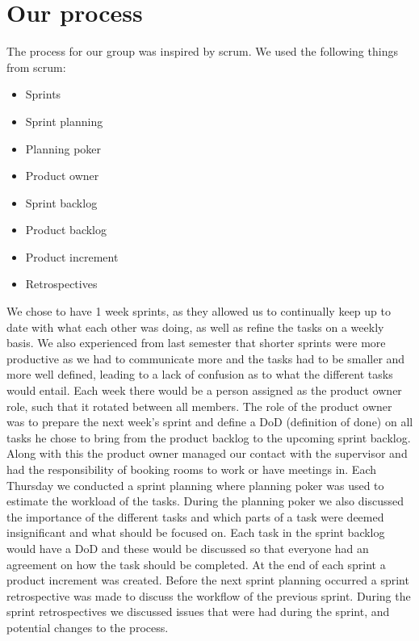 \section{Our process}\label{sec:our-process}
The process for our group was inspired by scrum. We used the following things from scrum:

\begin{itemize}
    \item Sprints 
    \item Sprint planning 
    \item Planning poker 
    \item Product owner 
    \item Sprint backlog 
    \item Product backlog   
    \item Product increment 
    \item Retrospectives 
\end{itemize}

\noindent
We chose to have 1 week sprints, as they allowed us to continually keep up to date with what each other was doing, as well as refine the tasks on a weekly basis.
We also experienced from last semester that shorter sprints were more productive as we had to communicate more and the tasks had to be smaller and more well defined, leading to a lack of confusion as to what the different tasks would entail. 
Each week there would be a person assigned as the product owner role, such that it rotated between all members.
The role of the product owner was to prepare the next week's sprint and define a DoD (definition of done) on all tasks he chose to bring from the product backlog to the upcoming sprint backlog.
Along with this the product owner managed our contact with the supervisor and had the responsibility of booking rooms to work or have meetings in.
Each Thursday we conducted a sprint planning where planning poker was used to estimate the workload of the tasks.
During the planning poker we also discussed the importance of the different tasks and which parts of a task were deemed insignificant and what should be focused on.
Each task in the sprint backlog would have a DoD and these would be discussed so that everyone had an agreement on how the task should be completed.
At the end of each sprint a product increment was created. 
Before the next sprint planning occurred a sprint retrospective was made to discuss the workflow of the previous sprint.
During the sprint retrospectives we discussed issues that were had during the sprint, and potential changes to the process.
